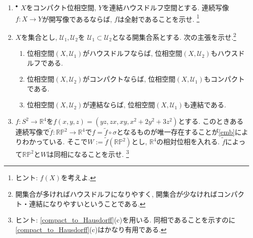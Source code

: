 \documentclass[dvipdfmx,a4paper,11pt]{article}
\newcommand{\R}{\mathbb{R}}
\theoremstyle{definition}
\begin{document}
\begin{enumerate}[label=\textbf{問}\ref*{sec-compact}.\arabic*]
\item $^{\bullet}$  $X$をコンパクト位相空間, $Y$を連結ハウスドルフ空間とする. 連続写像$f : X \rightarrow Y$が開写像であるならば, $f$は全射であることを示せ. \footnote{ヒント: $f(X)$を考えよ. }

\item $X$を集合とし, $\mathscr{U}_1, \mathscr{U}_2$を $\mathscr{U}_1 \subset \mathscr{U}_2$となる開集合系とする. 次の主張を示せ.\footnote{開集合が多ければハウスドルフになりやすく, 開集合が少なければコンパクト・連結になりやすいということである.}
\begin{enumerate}
\setlength{\parskip}{0cm}
  \setlength{\itemsep}{0pt} 
\item 位相空間$(X, \mathscr{U}_1)$がハウスドルフならば, 位相空間$(X, \mathscr{U}_2)$もハウスドルフである.
\item 位相空間$(X, \mathscr{U}_2)$がコンパクトならば, 位相空間$(X, \mathscr{U}_1)$もコンパクトである.
\item 位相空間$(X, \mathscr{U}_2)$が連結ならば, 位相空間$(X, \mathscr{U}_1)$も連結である.
\end{enumerate}



	





\item $f : S^2 \rightarrow \R^4$を$f(x,y,z)=(yz,zx,xy, x^2+2y^2 + 3z^2)$とする.  このときある連続写像で$\widetilde{f}: \R\mathbb{P}^{2} \rightarrow \R^4$で$f =\widetilde{f} \circ  \sigma$となるものが唯一存在することが\ref{emb}によりわかっている. そこで$W := \widetilde{f}(\R\mathbb{P}^{2})$とし, $\R^4$の相対位相を入れる. $\widetilde{f}$によって$\R\mathbb{P}^{2}$と$W$は同相になることを示せ. \footnote{ヒント: \ref{compact_to_Hausdorff}(c)を用いる. 同相であることを示すのに\ref{compact_to_Hausdorff}(c)はかなり有用である. }


\end{enumerate}
\end{document}
